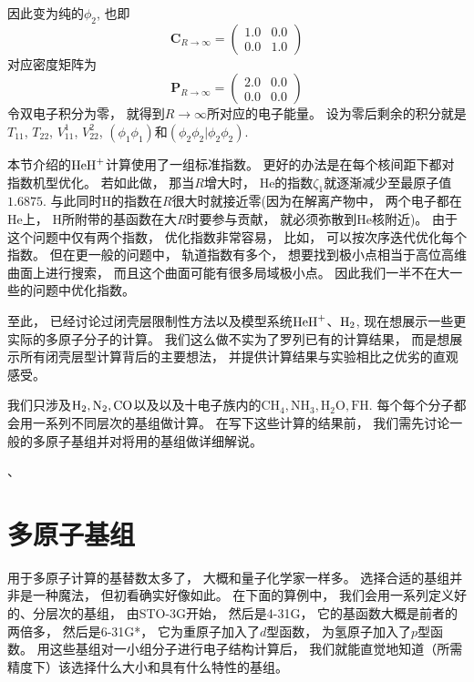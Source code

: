 因此变为纯的$\phi_2$, 
也即
\begin{equation}
	\mathbf{C}_{R\to\infty}=
	\begin{pmatrix}
		1.0&0.0\\0.0&1.0
	\end{pmatrix}
\end{equation} 
对应密度矩阵为
\begin{equation}
	\label{3.281}
	\mathbf{P}_{R\to\infty}=
	\begin{pmatrix}
		2.0&0.0\\0.0&0.0
	\end{pmatrix}
\end{equation}
令双电子积分为零，
就得到$R\to\infty$所对应的电子能量。
设为零后剩余的积分就是$T_{11}$, 
$T_{22}$, 
$V_{11}^1$, 
$V_{22}^2$, 
$(\phi_1\phi_1)$和$(\phi_2\phi_2|\phi_2\phi_2)$.


本节介绍的$\mathrm{HeH}^+$计算使用了一组标准指数。
更好的办法是在每个核间距下都对指数机型优化。
若如此做，
那当$R$增大时，
$\text{He}$的指数$\zeta_1$就逐渐减少至最原子值$1.6875$. 
与此同时$\text{H}$的指数在$R$很大时就接近零(因为在解离产物中，
两个电子都在$\text{He}$上，
$\text{H}$所附带的基函数在大$R$时要参与贡献，
就必须弥散到$\text{He}$核附近)。
由于这个问题中仅有两个指数，
优化指数非常容易，
比如，
可以按次序迭代优化每个指数。
但在更一般的问题中，
轨道指数有多个，
想要找到极小点相当于高位高维曲面上进行搜索，
而且这个曲面可能有很多局域极小点。
因此我们一半不在大一些的问题中优化指数。


至此，
已经讨论过闭壳层限制性\hft 方法以及模型系统$\mathrm{HeH}^+$、$\mathrm{H}_2$, 
现在想展示一些更实际的多原子分子的计算。
我们这么做不实为了罗列已有的计算结果，
而是想展示所有闭壳层\hft 型计算背后的主要想法，
并提供计算结果与实验相比之优劣的直观感受。


我们只涉及$\mathrm{H}_2, \text{N}_2, \text{CO}$以及以及十电子族内的$\text{CH}_4, \text{NH}_3, \text{H}_2\text{O}, \text{FH}$.
每个每个分子都会用一系列不同层次的基组做计算。
在写下这些计算的结果前，
我们需先讨论一般的多原子基组并对将用的基组做详细解说。

、
\section{多原子基组}
用于多原子计算的基替数太多了，
大概和量子化学家一样多。
选择合适的基组并非是一种魔法，
但初看确实好像如此。
在下面的算例中，
我们会用一系列定义好的、分层次的基组，
由STO-3G开始，
然后是4-31G，
它的基函数大概是前者的两倍多，
然后是6-31G*，
它为重原子加入了$d$型函数，
为氢原子加入了$p$型函数。
用这些基组对一小组分子进行电子结构计算后，
我们就能直觉地知道（所需精度下）该选择什么大小和具有什么特性的基组。


